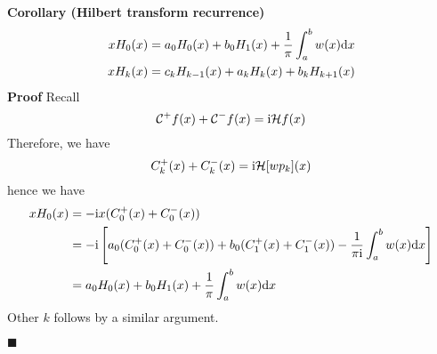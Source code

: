 \documentclass[12pt,landscape]{article}
\def\D{ {\rm d} }
\def\I{ {\rm i} }
\def\CC{ {\cal C} }
\def\HH{ {\cal H} }
\def\dx{\D x}
\begin{document}
{\textbf{Corollary (Hilbert transform recurrence)}
\begin{align*}
x H_0(x) &=  a_0 H_0(x) + b_0 H_1(x) + {1 \over \pi} \int_a^b w(x) \dx\\
x H_k(x) &=  c_k H_{k-1}(x) + a_k H_k(x) + b_k H_{k+1}(x)
\end{align*}
\newpage
\textbf{Proof} Recall
\[
\CC^+ f(x) + \CC^- f(x) = \I \HH f(x)
\]
Therefore, we have
\[
C_k^+(x) + C_k^-(x) = \I \HH[w p_k](x)
\]
hence we have
\begin{align*}
x H_0(x) &= -\I x (C_0^+(x) + C_0^-(x))\\
& = - \I \left[a_0 (C_0^+(x) + C_0^-(x)) + b_0 (C_1^+(x) + C_1^-(x))    -{1 \over  \pi \I} \int_a^b w(x) \dx \right]\\
            &=  a_0 H_0(x) + b_0 H_1(x) + {1 \over \pi} \int_a^b w(x) \dx
\end{align*}
Other $k$ follows by a similar argument.

\ensuremath{\blacksquare}
\newpage
}
\end{document}
